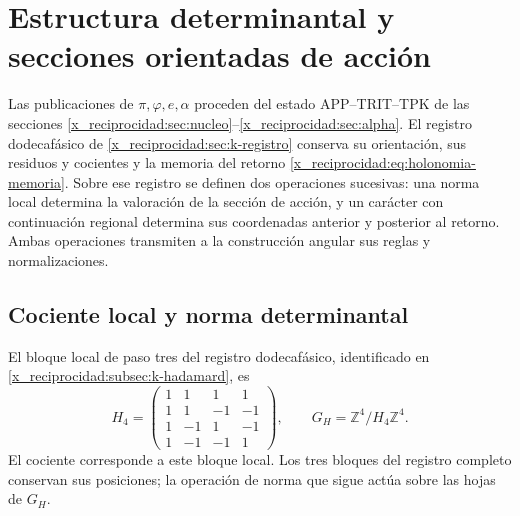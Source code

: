 \section{Estructura determinantal y secciones orientadas de acción}
\label{x_reciprocidad:iv:action:section}

Las publicaciones de \(\pi,\varphi,e,\alpha\) proceden del estado
APP--TRIT--TPK de las secciones
\ref{x_reciprocidad:sec:nucleo}--\ref{x_reciprocidad:sec:alpha}. El registro dodecafásico de
\ref{x_reciprocidad:sec:k-registro} conserva su orientación, sus residuos y
cocientes y la memoria del retorno
\eqref{x_reciprocidad:eq:holonomia-memoria}. Sobre ese registro se definen dos operaciones
sucesivas: una norma local determina la valoración de la sección de
acción, y un carácter con continuación regional determina sus
coordenadas anterior y posterior al retorno. Ambas operaciones
transmiten a la construcción angular sus reglas y normalizaciones.

\subsection{Cociente local y norma determinantal}
\label{x_reciprocidad:iv:action:determinantal}

El bloque local de paso tres del registro dodecafásico, identificado
en \ref{x_reciprocidad:subsec:k-hadamard}, es
\begin{equation}
 H_4=\begin{pmatrix}
 1&1&1&1\\
 1&1&-1&-1\\
 1&-1&1&-1\\
 1&-1&-1&1
 \end{pmatrix},
 \qquad G_H=\mathbb Z^4/H_4\mathbb Z^4.
 \label{x_reciprocidad:iv:action:h4}
\end{equation}
El cociente corresponde a este bloque local. Los tres bloques del
registro completo conservan sus posiciones; la operación de norma
que sigue actúa sobre las hojas de \(G_H\).

